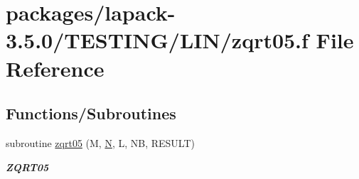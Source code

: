 \hypertarget{zqrt05_8f}{}\section{packages/lapack-\/3.5.0/\+T\+E\+S\+T\+I\+N\+G/\+L\+I\+N/zqrt05.f File Reference}
\label{zqrt05_8f}
\subsection*{Functions/\+Subroutines}
\begin{DoxyCompactItemize}
\item 
subroutine \hyperlink{group__complex16__lin_ga4b67e894aaa9446001baffcf8bd1ee3e}{zqrt05} (M, \hyperlink{polmisc_8c_a0240ac851181b84ac374872dc5434ee4}{N}, L, N\+B, R\+E\+S\+U\+L\+T)
\begin{DoxyCompactList}\small\item\em {\bfseries Z\+Q\+R\+T05} \end{DoxyCompactList}\end{DoxyCompactItemize}
